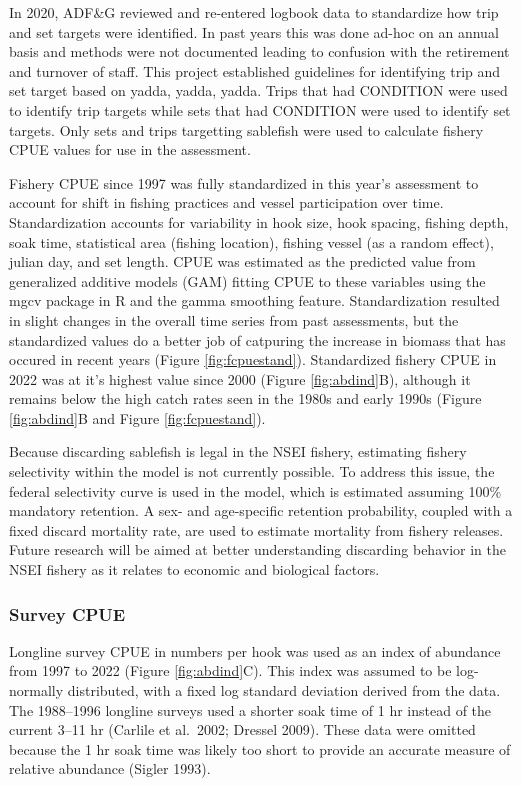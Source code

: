 \documentclass[
]{article}
\begin{document}
{In 2020, ADF\&G reviewed and re-entered logbook data to standardize how trip and set targets were identified. In past years this was done ad-hoc on an annual basis and methods were not documented leading to confusion with the retirement and turnover of staff. This project established guidelines for identifying trip and set target based on yadda, yadda, yadda. Trips that had CONDITION were used to identify trip targets while sets that had CONDITION were used to identify set targets. Only sets and trips targetting sablefish were used to calculate fishery CPUE values for use in the assessment. }

Fishery CPUE since 1997 was fully standardized in this year's assessment to account for shift in fishing practices and vessel participation over time. Standardization accounts for variability in hook size, hook spacing, fishing depth, soak time, statistical area (fishing location), fishing vessel (as a random effect), julian day, and set length. CPUE was estimated as the predicted value from generalized additive models (GAM) fitting CPUE to these variables using the mgcv package in R and the gamma smoothing feature. Standardization resulted in slight changes in the overall time series from past assessments, but the standardized values do a better job of catpuring the increase in biomass that has occured in recent years (Figure \ref{fig:fcpuestand}). Standardized fishery CPUE in 2022 was at it's highest value since 2000 (Figure \ref{fig:abdind}B), although it remains below the high catch rates seen in the 1980s and early 1990s (Figure \ref{fig:abdind}B and Figure \ref{fig:fcpuestand}).

Because discarding sablefish is legal in the NSEI fishery, estimating fishery selectivity within the model is not currently possible. To address this issue, the federal selectivity curve is used in the model, which is estimated assuming 100\% mandatory retention. A sex- and age-specific retention probability, coupled with a fixed discard mortality rate, are used to estimate mortality from fishery releases. Future research will be aimed at better understanding discarding behavior in the NSEI fishery as it relates to economic and biological factors.

\hypertarget{survey-cpue}{%
\subsubsection{Survey CPUE}\label{survey-cpue}}

Longline survey CPUE in numbers per hook was used as an index of abundance from 1997 to 2022 (Figure \ref{fig:abdind}C). This index was assumed to be log-normally distributed, with a fixed log standard deviation derived from the data. The 1988--1996 longline surveys used a shorter soak time of 1 hr instead of the current 3--11 hr (Carlile et al.~2002; Dressel 2009). These data were omitted because the 1 hr soak time was likely too short to provide an accurate measure of relative abundance (Sigler 1993).
\end{document}
